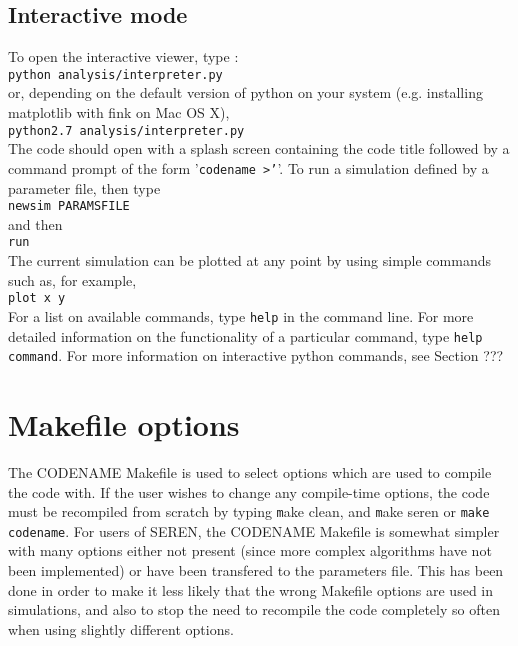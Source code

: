 \documentclass[a4paper]{article}
\newcommand{\var}[1]{\texttt{#1}}
\begin{document}
\subsection{Interactive mode}


\noindent To open the interactive viewer, type : \\
\newline
\var{python analysis/interpreter.py} \\
\newline
or, depending on the default version of python on your system (e.g. installing matplotlib with fink on Mac OS X), \\
\newline
\var{python2.7 analysis/interpreter.py} \\
\newline
\noindent The code should open with a splash screen containing the code title followed by a command prompt of the form '\var{codename >'}'.  To run a simulation defined by a parameter file, then type \\
\newline
\var{newsim PARAMSFILE} \\
\newline
\noindent and then \\
\newline
\var{run} \\
\newline
\noindent The current simulation can be plotted at any point by using simple commands such as, for example, \\
\newline
\var{plot x y} \\
\newline
\noindent For a list on available commands, type \var{help} in the command line.  For more detailed information on the functionality of a particular command, type \var{help command}.  For more information on interactive python commands, see Section ???

\newpage


\section{Makefile options} \label{S:MAKEFILE}
The CODENAME Makefile is used to select options which are used to compile the code with.  If the user wishes to change any compile-time options, the code must be recompiled from scratch by typing {\var make clean}, and {\var make seren} or \var{make codename}.  For users of SEREN, the CODENAME Makefile is somewhat simpler with many options either not present (since more complex algorithms have not been implemented) or have been transfered to the parameters file.  This has been done in order to make it less likely that the wrong Makefile options are used in simulations, and also to stop the need to recompile the code completely so often when using slightly different options.
\end{document}
